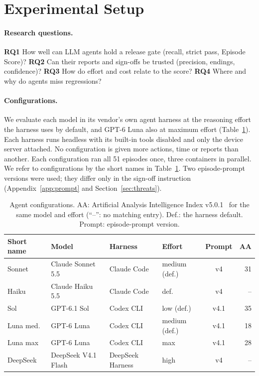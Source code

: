 \documentclass[sigconf]{acmart}
\newcommand{\rqref}[1]{\textbf{RQ#1}}
\begin{document}
\section{Experimental Setup}
\label{sec:setup}

\paragraph{Research questions.}
\rqref{1} How well can LLM agents hold a release gate (recall, strict pass, Episode Score)?
\rqref{2} Can their reports and sign-offs be trusted (precision, endings, confidence)?
\rqref{3} How do effort and cost relate to the score?
\rqref{4} Where and why do agents miss regressions?

\paragraph{Configurations.}
We evaluate each model in its vendor's own agent harness at the reasoning effort the harness uses by
default, and GPT-6 Luna also at maximum effort (Table~\ref{tab:configs}). Each harness runs headless
with its built-in tools disabled and only the device server attached. No configuration is given more
actions, time or reports than another. Each configuration ran all 51 episodes once, three containers
in parallel. We refer to configurations by the short names in Table~\ref{tab:configs}. Two
episode-prompt versions were used; they differ only in the sign-off instruction
(Appendix~\ref{app:prompt} and Section~\ref{sec:threats}).

\begin{table}[t]
  \caption{Agent configurations. AA: Artificial Analysis Intelligence Index v5.0.1~\cite{aa2026index}
  for the same model and effort (``--'': no matching entry). Def.: the harness default. Prompt:
  episode-prompt version.}
  \label{tab:configs}
  \footnotesize\setlength{\tabcolsep}{2.4pt}
  \begin{tabular}{@{}llllcr@{}}
    \toprule
    Short name & Model & Harness & Effort & Prompt & AA \\
    \midrule
    Sonnet & Claude Sonnet 5.5 & Claude Code & medium (def.) & v4 & 31 \\
    Haiku & Claude Haiku 5.5 & Claude Code & def. & v4 & -- \\
    Sol & GPT-6.1 Sol & Codex CLI & low (def.) & v4.1 & 35 \\
    Luna med. & GPT-6 Luna & Codex CLI & medium (def.) & v4.1 & 18 \\
    Luna max & GPT-6 Luna & Codex CLI & max & v4.1 & 28 \\
    DeepSeek & DeepSeek V4.1 Flash & DeepSeek Harness & high & v4 & -- \\
    \bottomrule
  \end{tabular}
\end{table}
\end{document}
